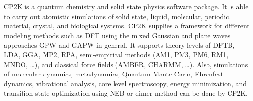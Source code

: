 CP2K is a quantum chemistry and solid state physics software package. It is able to carry out atomistic simulations of solid state, liquid, molecular, periodic, material, crystal, and biological systems. CP2K supplies a framework for different modeling methods such as DFT using the mixed Gaussian and plane waves approaches GPW and GAPW in general. It supports theory levels of DFTB, LDA, GGA, MP2, RPA, semi-empirical methods (AM1, PM3, PM6, RM1, MNDO, …), and classical force fields (AMBER, CHARMM, …). Also, simulations of molecular dynamics, metadynamics, Quantum Monte Carlo, Ehrenfest dynamics, vibrational analysis, core level spectroscopy, energy minimization, and transition state optimization using NEB or dimer method can be done by CP2K.